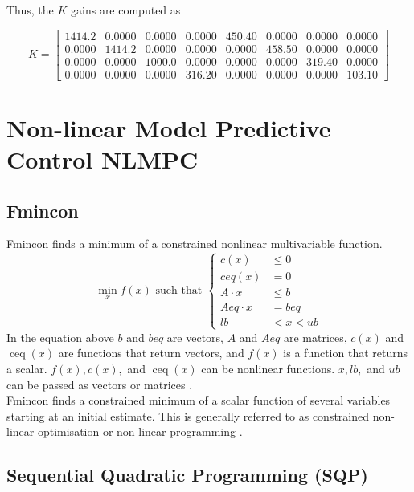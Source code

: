 \documentclass{UoNMCHA}
\numberwithin{equation}{section}
\begin{document}
	Thus, the ${K}$ gains are computed as
	
	\begin{equation}\label{eq/k_gain}
	K = 
	\begin{bmatrix}1414.2 & 0.0000 & 0.0000 & 0.0000 & 450.40 & 0.0000 & 0.0000 & 0.0000 \\ 0.0000 & 1414.2 & 0.0000 & 0.0000 & 0.0000 & 458.50 & 0.0000 & 0.0000 \\ 0.0000 & 0.0000 & 1000.0 & 0.0000 & 0.0000 & 0.0000 & 319.40 & 0.0000 \\ 0.0000 & 0.0000 & 0.0000 & 316.20 & 0.0000 & 0.0000 & 0.0000 & 103.10\end{bmatrix}
	\end{equation}
	
	\newpage
	\section{Non-linear Model Predictive Control NLMPC}
	
	\subsection{Fmincon}
	Fmincon finds a minimum of a constrained nonlinear multivariable function.
	\begin{equation}
	\min _{x} f(x) \text { such that }\left\{\begin{aligned}
	c(x) & \leq 0 \\
	{ceq}(x) &=0 \\
	A \cdot x & \leq b \\
	A e q \cdot x &=b e q \\
	l b &<x<u b
	\end{aligned}\right.
	\end{equation}
	In the equation above $b$ and $beq$ are vectors, $A$ and $ Aeq $ are matrices, $c(x)$ and $\operatorname{ceq}(x)$ are functions that return vectors, and $f(x)$
	is a function that returns a scalar. $f(x), c(x),$ and $\operatorname{ceq}(x)$ can be nonlinear functions. $x, lb,$ and $ub$ can be
	passed as vectors or matrices \cite{rabaey_optimization}.\\
	
	Fmincon finds a constrained minimum of a scalar function of several variables starting at an initial estimate. This is generally referred to as constrained non-linear optimisation or non-linear programming \cite{rabaey_optimization}. 
	
	\subsection{Sequential Quadratic Programming (SQP)}
	
\end{document}
